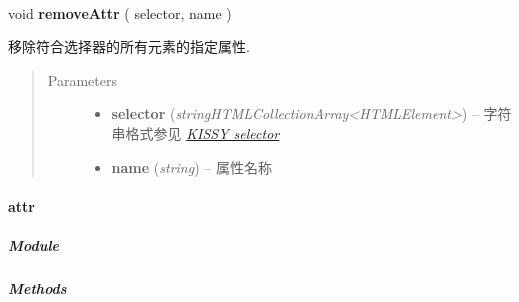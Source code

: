 \documentclass[letterpaper,10pt,english]{sphinxmanual}
\begin{document}
\begin{fulllineitems}
\label{api/core/dom/removeAttr:DOM.removeAttr}~
\begin{DUlineblock}{0em}
\item[] void \textbf{removeAttr} ( selector, name )
\item[] 移除符合选择器的所有元素的指定属性.
\end{DUlineblock}
\begin{quote}\begin{description}
\item[{Parameters}] \leavevmode\begin{itemize}
\item {}
\textbf{selector} (\emph{string\textbar{}HTMLCollection\textbar{}Array\textless{}HTMLElement\textgreater{}}) -- 字符串格式参见 {\hyperref[api/core/dom/selector:dom-selector]{\emph{KISSY selector}}}

\item {}
\textbf{name} (\emph{string}) -- 属性名称

\end{itemize}

\end{description}\end{quote}

\end{fulllineitems}



\paragraph{attr}
\label{api/core/dom/attr::doc}\label{api/core/dom/attr:attr}

\subparagraph{Module}
\label{api/core/dom/attr:module}\begin{quote}

{\hyperref[api/core/dom/index:module-DOM]{}}
\end{quote}


\subparagraph{Methods}
\label{api/core/dom/attr:methods}
\end{document}
